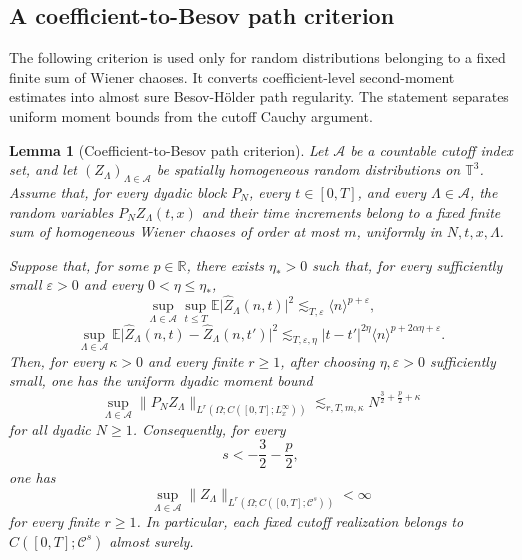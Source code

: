 \documentclass[10pt]{amsart}
\numberwithin{equation}{section}
\theoremstyle{plain}
\newtheorem{lemma}[theorem]{Lemma}
\theoremstyle{definition}
\theoremstyle{remark}
\newcommand{\T}{\mathbb{T}}
\newcommand{\R}{\mathbb{R}}
\newcommand{\E}{\mathbb{E}}
\newcommand{\C}{\mathcal{C}}
\newcommand{\eps}{\varepsilon}
\newcommand{\la}{\langle}
\newcommand{\ra}{\rangle}
\begin{document}
\subsection{A coefficient-to-Besov path criterion}

The following criterion is used only for random distributions belonging to a fixed finite sum of Wiener chaoses.  It converts coefficient-level second-moment estimates into almost sure Besov-H\"older path regularity.  The statement separates uniform moment bounds from the cutoff Cauchy argument.

\begin{lemma}[Coefficient-to-Besov path criterion]\label{lem:B-coeff-besov}
Let \(\mathcal A\) be a countable cutoff index set, and let \((Z_\Lambda)_{\Lambda\in\mathcal A}\) be spatially homogeneous random distributions on \(\T^3\).  Assume that, for every dyadic block \(P_N\), every \(t\in[0,T]\), and every \(\Lambda\in\mathcal A\), the random variables \(P_NZ_\Lambda(t,x)\) and their time increments belong to a fixed finite sum of homogeneous Wiener chaoses of order at most \(m\), uniformly in \(N,t,x,\Lambda\).

Suppose that, for some \(p\in\R\), there exists \(\eta_*>0\) such that, for every sufficiently small \(\eps>0\) and every \(0<\eta\le\eta_*\),
\begin{equation}\label{B:coeff-fixed-ass}
        \sup_{\Lambda\in\mathcal A}\sup_{t\le T}
        \E\bigl|\widehat Z_\Lambda(n,t)\bigr|^2
        \lesssim_{T,\eps}
        \la n\ra^{p+\eps},
\end{equation}
\begin{equation}\label{B:coeff-incr-ass}
        \sup_{\Lambda\in\mathcal A}
        \E\bigl|\widehat Z_\Lambda(n,t)-\widehat Z_\Lambda(n,t')\bigr|^2
        \lesssim_{T,\eps,\eta}
        |t-t'|^{2\eta}\la n\ra^{p+2\alpha\eta+\eps}.
\end{equation}
Then, for every \(\kappa>0\) and every finite \(r\ge1\), after choosing \(\eta,\eps>0\) sufficiently small, one has the uniform dyadic moment bound
\begin{equation}\label{B:block-moment-criterion}
        \sup_{\Lambda\in\mathcal A}
        \bigl\|P_NZ_\Lambda\bigr\|_{L^r(\Omega;C([0,T];L^\infty_x))}
        \lesssim_{r,T,m,\kappa}
        N^{\frac{3}{2}+\frac{p}{2}+\kappa}
\end{equation}
for all dyadic \(N\ge1\).  Consequently, for every
\[
        s<-\frac{3}{2}-\frac{p}{2},
\]
one has
\begin{equation}\label{B:besov-moment-criterion}
        \sup_{\Lambda\in\mathcal A}
        \bigl\|Z_\Lambda\bigr\|_{L^r(\Omega;C([0,T];\C^s))}<\infty
\end{equation}
for every finite \(r\ge1\).  In particular, each fixed cutoff realization belongs to \(C([0,T];\C^s)\) almost surely.


\end{lemma}
\end{document}
